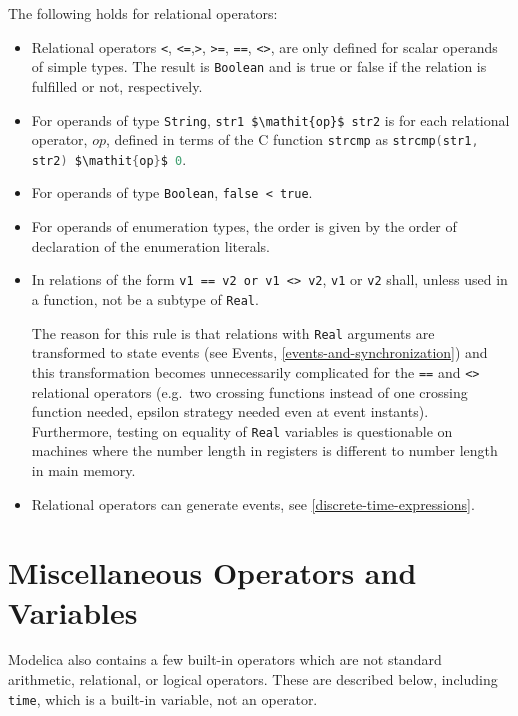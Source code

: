 The following holds for relational operators:
\begin{itemize}
\item
  Relational operators \lstinline!<!, \lstinline!<=!,\lstinline!>!,
\lstinline!>=!, \lstinline!==!, \lstinline!<>!, are only defined for
  scalar operands of simple types. The result is \lstinline!Boolean! and is true or
  false if the relation is fulfilled or not, respectively.
\item
  For operands of type \lstinline!String!, \lstinline!str1 $\mathit{op}$ str2! is for each relational
  operator, $\mathit{op}$, defined in terms of the C function \lstinline[language=C]!strcmp! as
  \lstinline[language=C]!strcmp(str1, str2) $\mathit{op}$ 0!.
\item
  For operands of type \lstinline!Boolean!, \lstinline!false < true!.
\item
  For operands of enumeration types, the order is given by the order of
  declaration of the enumeration literals.
\item
  In relations of the form \lstinline!v1 == v2 or v1 <> v2!,
  \lstinline!v1! or \lstinline!v2! shall, unless used in a function, not be a subtype of \lstinline!Real!.
  \begin{nonnormative}
  The reason for this rule is that relations with \lstinline!Real! arguments are transformed to state events (see Events, \cref{events-and-synchronization}) and this transformation becomes unnecessarily complicated for the \lstinline!==! and \lstinline!<>! relational operators (e.g.\ two crossing functions instead of one crossing function needed, epsilon strategy needed even at event instants).  Furthermore, testing on equality of \lstinline!Real! variables is questionable on machines where the number length in registers is different to number length in main memory.
  \end{nonnormative}
\item
  Relational operators can generate events, see \cref{discrete-time-expressions}.
\end{itemize}

\section{Miscellaneous Operators and Variables}\label{miscellaneous-operators-and-variables}

Modelica also contains a few built-in operators which are not standard
arithmetic, relational, or logical operators. These are described below,
including \lstinline!time!, which is a built-in variable, not an operator.

